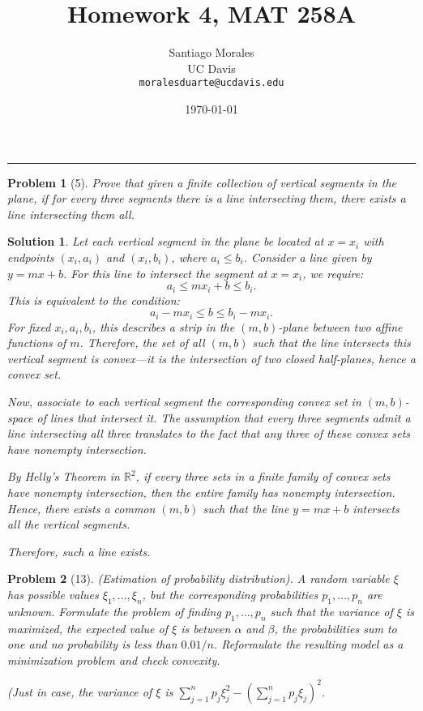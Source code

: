 \documentclass[11pt]{article}
\title{\vspace{-1cm} \textbf{Homework 4, MAT 258A}}
\author{Santiago Morales \\ UC Davis \\ \texttt{moralesduarte@ucdavis.edu}}
\date{\today}
\theoremstyle{mystyle}
\newtheorem{problem}{Problem}
\newtheorem*{solution}{Solution}
\begin{document}
\maketitle
\vspace{-1em}
\hrule
\vspace{1em}

\begin{problem}[5]
Prove that given a finite collection of vertical segments in the plane, if for every three segments there is a line intersecting them, there exists a line intersecting them all.
\end{problem}
        
\begin{solution}
        Let each vertical segment in the plane be located at \(x = x_i\) with endpoints \((x_i, a_i)\) and \((x_i, b_i)\), where \(a_i \leq b_i\). Consider a line given by \(y = mx + b\). For this line to intersect the segment at \(x = x_i\), we require:
        \[
        a_i \leq mx_i + b \leq b_i.
        \]
        This is equivalent to the condition:
        \[
        a_i - mx_i \leq b \leq b_i - mx_i.
        \]
        For fixed \(x_i, a_i, b_i\), this describes a strip in the \((m, b)\)-plane between two affine functions of \(m\). Therefore, the set of all \((m, b)\) such that the line intersects this vertical segment is convex—it is the intersection of two closed half-planes, hence a convex set.
        
        Now, associate to each vertical segment the corresponding convex set in \((m, b)\)-space of lines that intersect it. The assumption that every three segments admit a line intersecting all three translates to the fact that any three of these convex sets have nonempty intersection.
        
        By Helly’s Theorem in \(\mathbb{R}^2\), if every three sets in a finite family of convex sets have nonempty intersection, then the entire family has nonempty intersection. Hence, there exists a common \((m, b)\) such that the line \(y = mx + b\) intersects all the vertical segments.
        
        Therefore, such a line exists.
\end{solution}

\begin{problem}[13]
(Estimation of probability distribution). A random variable \(\xi\) has possible values \(\xi_1, \ldots, \xi_n\), but the corresponding probabilities \(p_1, \ldots, p_n\) are unknown. Formulate the problem of finding \(p_1, \ldots, p_n\) such that the variance of \(\xi\) is maximized, the expected value of \(\xi\) is between \(\alpha\) and \(\beta\), the probabilities sum to one and no probability is less than \(0.01/n\). Reformulate the resulting model as a minimization problem and check convexity.

\emph{(Just in case, the variance of \(\xi\) is \(\sum_{j=1}^n p_j \xi_j^2 - \left(\sum_{j=1}^n p_j \xi_j\right)^2\).}
\end{problem}
\end{document}
